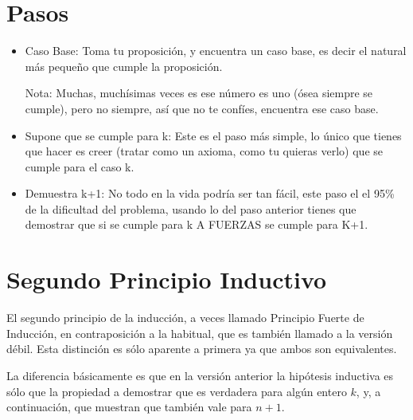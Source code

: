 \documentclass[12pt, fleqn]{report}                             %
\begin{document}
            
            \section{Pasos}

                \begin{itemize}
                    \item Caso Base: 
                        Toma tu proposición, y encuentra un caso base, es decir el natural más
                        pequeño que cumple la proposición.

                        Nota: Muchas, muchísimas veces es ese número es uno (ósea siempre se cumple), pero no
                        siempre, así que no te confíes, encuentra ese caso base.

                    \item Supone que se cumple para k: Este es el paso más simple, lo único que tienes que hacer
                        es creer (tratar como un axioma, como tu quieras verlo) que se cumple para el caso k.

                    \item Demuestra k+1: No todo en la vida podría ser tan fácil, este paso el el 95\% de la
                        dificultad del problema, usando lo del paso anterior tienes que demostrar que si se
                        cumple para k A FUERZAS se cumple para K+1.

                \end{itemize}


        \clearpage
        \section{Segundo Principio Inductivo}

            El segundo principio de la inducción, a veces llamado Principio Fuerte de Inducción, 
            en contraposición a la habitual, que es también llamado a la versión débil. Esta distinción
            es sólo aparente a primera ya que ambos son equivalentes.

            La diferencia básicamente es que en la versión anterior la hipótesis inductiva es sólo que la
            propiedad a demostrar que es verdadera para algún entero $k$, y, a continuación,
            que muestran que también vale para $n+1$.
\end{document}
